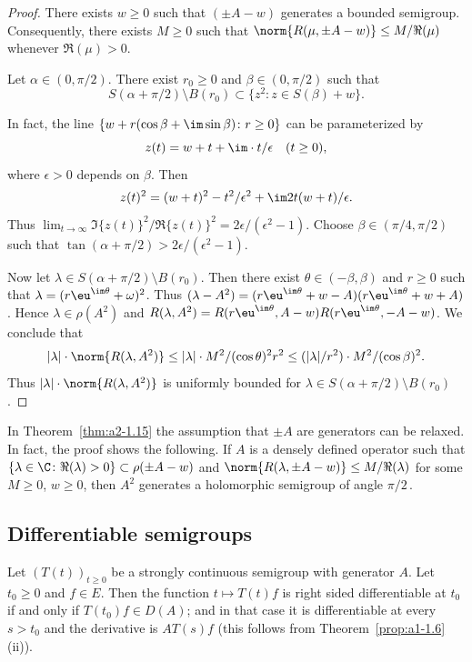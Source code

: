 \begin{proof}
There exists $w \geq 0$ such that $(\pm A - w)$ generates a bounded semigroup.
Consequently, there exists $M \geq 0$ such that $\norm{R(\mu,\pm A - w)} \leq M/\Re(\mu)$ whenever $\Re(\mu) > 0$.

Let $\alpha \in (0,\pi/2)$.
There exist $r_0 \geq 0$ and $\beta \in (0,\pi/2)$ such that
\[
    S(\alpha+\pi/2)\setminus B(r_{0}) \subset \{ z^2 \colon z \in S(\beta) + w \}.
\]

In fact, the line 
$ \{w + r(\cos\beta + \im \sin\beta) \colon r \geq 0\} $ 
can be parameterized by 
%
\[
	 z(t) = w + t + \im\cdot t/\epsilon \quad (t \geq 0) ,
\]
%
where $\epsilon > 0$ depends on $\beta$.
Then 
%
\[
	z(t)^2 = (w + t)^2 - t^2/\epsilon^2 + \im 2t(w+t)/\epsilon .
\]
%
Thus $\lim_{t \to \infty} \Im\{z(t)\}^2/\Re\{z(t)\}^2 = 2\epsilon/(\epsilon^2-1)$.
Choose $\beta \in (\pi/4,\pi/2)$ such that $\tan(\alpha + \pi/2) > 2\epsilon/(\epsilon^2-1)$. 

Now let $\lambda \in S(\alpha+\pi/2)\setminus B(r_{0})$.
Then there exist $\theta \in (-\beta,\beta)$ 
and $r \geq 0$
such that $\lambda = (r\eu^{\im\theta}+\omega)^2$.
Thus $(\lambda-A^2) = (r\eu^{\im\theta}+w - A)(r\eu^{\im\theta}+w + A)$.
Hence $\lambda \in \rho(A^2)$ and $R(\lambda,A^2) = R(r\eu^{\im\theta},A-w)R(r\eu^{\im\theta},-A-w)$.
We conclude that 
\[
|\lambda| \cdot \norm{R(\lambda,A^2)} \leq |\lambda| \cdot M^2/(\cos\theta)^2r^2 \leq (|\lambda|/r^2)\cdot M^2/(\cos\beta)^2.
\]
Thus $|\lambda| \cdot \norm{R(\lambda,A^2)}$ is uniformly bounded for $\lambda \in S(\alpha+\pi/2) \setminus B(r_0)$.
\end{proof}
\begin{remark*}\label{rem:a2-1.7-kgk}
In Theorem~\ref{thm:a2-1.15}  
the assumption that $\pm A$ are generators can be relaxed.
In fact, the proof shows the following.
If\/ $A$ is a densely defined operator such that 
$\{\lambda \in \C \colon \Re(\lambda) > 0\} \subset \rho(\pm A - w)$ and 
$\norm{R(\lambda,\pm A - w)} \leq M/\Re(\lambda)$ for some $M \geq 0$, $w \geq 0$, then $A^2$ generates a holomorphic semigroup of angle $\pi/2$\,.
\end{remark*}

\subsection{Differentiable semigroups} \label{subsec:a2-1.se5}%
Let $(T(t))_{t\geq 0}$ be a strongly continuous semigroup with generator $A$.
Let $t_0 \geq 0$ and $f \in E$.
Then the function $t \mapsto T(t)f$ is right sided differentiable at $t_0$ if and only if\/ $T(t_0)f \in D(A)$; and in that case it is differentiable at every $s > t_0$ and the derivative is $AT(s)f$ (this follows from Theorem~\ref{prop:a1-1.6}\,(ii)).

